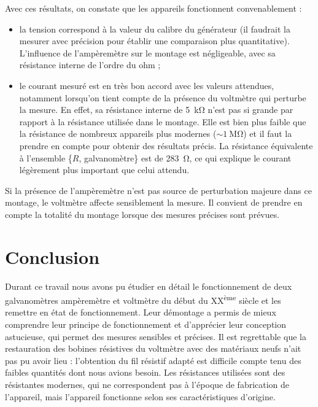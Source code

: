 \documentclass[12pt,a4paper,fleqn]{article}
\begin{document}
Avec ces résultats, on constate que les appareils fonctionnent convenablement : 
\begin{itemize}
\item la tension correspond à la valeur du calibre du générateur (il faudrait la mesurer avec précision pour établir une comparaison plus quantitative).
L'influence de l'ampèremètre sur le montage est négligeable, avec sa résistance interne de l'ordre du ohm ;
\item le courant mesuré est en très bon accord avec les valeurs attendues, notamment lorsqu'on tient compte de la présence du voltmètre qui perturbe la mesure.
En effet, sa résistance interne de \qty{5}{\kilo\ohm} n'est pas si grande par rapport à la résistance utilisée dans le montage.
Elle est bien plus faible que la résistance de nombreux appareils plus modernes ($\sim\qty{1}{\mega\ohm}$) et il faut la prendre en compte pour obtenir des résultats précis.
La résistance équivalente à l'ensemble \{$R$, galvanomètre\} est de \qty{283}{\ohm}, ce qui explique le courant légèrement plus important que celui attendu.
\end{itemize}
Si la présence de l'ampèremètre n'est pas source de perturbation majeure dans ce montage, le voltmètre affecte sensiblement la mesure.
Il convient de prendre en compte la totalité du montage lorsque des mesures précises sont prévues.






\section*{Conclusion}

Durant ce travail nous avons pu étudier en détail le fonctionnement de deux galvanomètres ampèremètre et voltmètre du début du XX\textsuperscript{ème} siècle et les remettre en état de fonctionnement.
Leur démontage a permis de mieux comprendre leur principe de fonctionnement et d'apprécier leur conception astucieuse, qui permet des mesures sensibles et précises.
Il est regrettable que la restauration des bobines résistives du voltmètre avec des matériaux neufs n'ait pas pu avoir lieu : l'obtention du fil résistif adapté est difficile compte tenu des faibles quantités dont nous avions besoin.
Les résistances utilisées sont des résistantes modernes, qui ne correspondent pas à l'époque de fabrication de l'appareil, mais l'appareil fonctionne selon ses caractéristiques d'origine.
\end{document}
